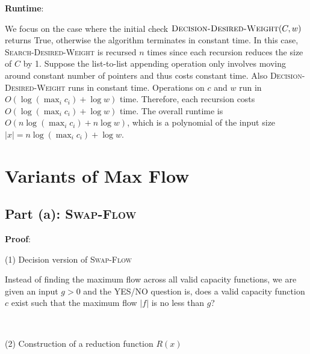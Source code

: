 \documentclass{article}
\begin{document}
\noindent\textbf{Runtime}:

We focus on the case where the initial check $\textsc{Decision-Desired-Weight}(C,w)$ returns True, otherwise the algorithm terminates in constant time. In this case, \textsc{Search-Desired-Weight} is recursed $n$ times since each recursion reduces the size of $C$ by 1. Suppose the list-to-list appending operation only involves moving around constant number of pointers and thus costs constant time. Also \textsc{Decision-Desired-Weight} runs in constant time. Operations on $c$ and $w$ run in $O(\log(\max_ic_i)+\log w)$ time. Therefore, each recursion costs $O(\log(\max_ic_i)+\log w)$ time. The overall runtime is $O(n\log(\max_ic_i)+n\log w)$, which is a polynomial of the input size $|x|=n\log(\max_ic_i)+\log w$.

\section{Variants of Max Flow}
\subsection{Part (a): \textsc{Swap-Flow}}
\noindent\textbf{Proof}:

\noindent(1) Decision version of \textsc{Swap-Flow}

Instead of finding the maximum flow across all valid capacity functions, we are given an input $g>0$ and the YES/NO question is, does a valid capacity function $c$ exist such that the maximum flow $|f|$ is no less than $g$?

~

\noindent(2) Construction of a reduction function $R(x)$
\end{document}
